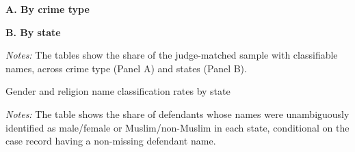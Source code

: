 \documentclass[12pt,english]{article}
\newcommand{\HOME}{\string~}
\newcommand{\curpath}{\HOME/ddl/justice-overleaf}
\newcommand{\curpath}{.}
\begin{document}
\begin{appendices}
\begin{table}
\begin{center}
  \textbf{ {\small A. By crime type}} \\
  
    {\scriptsize  }

    \vspace{5mm}
    
  \textbf{\small B. By state} \\
    
    {\scriptsize }
    
  \end{center}
   \begin{minipage}{1.0\textwidth}
     {\scriptsize \emph{Notes:} The tables show the share of the judge-matched sample with classifiable names, across crime type (Panel A) and states (Panel B).\par}
 \end{minipage}
\end{table}

\newpage
\begin{table}
  \begin{center}
  \caption{Gender and religion name classification rates by state}
  \label{tab:lstm_by_state}
  
  \end{center}
   \begin{minipage}{1.0\textwidth}
    {\scriptsize \emph{Notes:} The table shows the share of defendants whose names were unambiguously identified as male/female or Muslim/non-Muslim in each state, conditional on the case record having a non-missing defendant name.\par}
 \end{minipage}
\end{table}


\begin{landscape}


\end{landscape}
\end{appendices}
\end{document}
